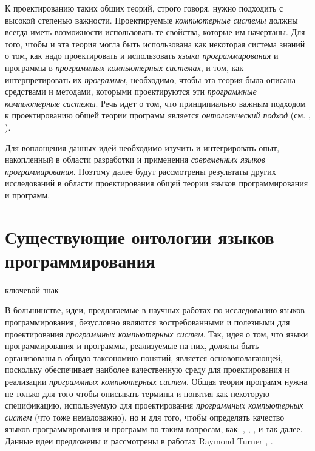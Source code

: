 К проектированию таких общих теорий, строго говоря, нужно подходить с высокой степенью важности. Проектируемые \textit{компьютерные системы} должны всегда иметь возможности использовать те свойства, которые им начертаны. Для того, чтобы и эта теория могла быть использована как некоторая система знаний о том, как надо проектировать и использовать \textit{языки программирования} и программы в \textit{программных компьютерных системах}, и том, как интерпретировать их \textit{программы}, необходимо, чтобы эта теория была описана средствами и методами, которыми проектируются эти \textit{программные компьютерные системы}. Речь идет о том, что принципиально важным подходом к проектированию общей теории программ является \textit{онтологический подход} (см. , ).

Для воплощения данных идей необходимо изучить и интегрировать опыт, накопленный в области разработки и применения \textit{современных языков программирования}. Поэтому далее будут рассмотрены результаты других исследований в области проектирования общей теории языков программирования и программ.

\section{Существующие онтологии языков программирования}
\label{sec_programs_ontologies}

\begin{SCn}

\begin{scnrelfromlist}{ключевой знак}
\end{scnrelfromlist}
	
\end{SCn}

В большинстве, идеи, предлагаемые в научных работах по исследованию языков программирования, безусловно являются востребованными и полезными для проектирования \textit{программных компьютерных систем}. Так, идея о том, что языки программирования и программы, реализуемые на них, должны быть организованы в общую таксономию понятий, является основополагающей, поскольку обеспечивает наиболее качественную среду для проектирования и реализации \textit{программных компьютерных систем}. Общая теория программ нужна не только для того чтобы описывать термины и понятия как некоторую спецификацию, используемую для проектирования \textit{программных компьютерных систем} (что тоже немаловажно), но и для того, чтобы определять качество языков программирования и программ по таким вопросам, как: , , ,  и так далее. Данные идеи предложены и рассмотрены в работах Raymond Turner , .


